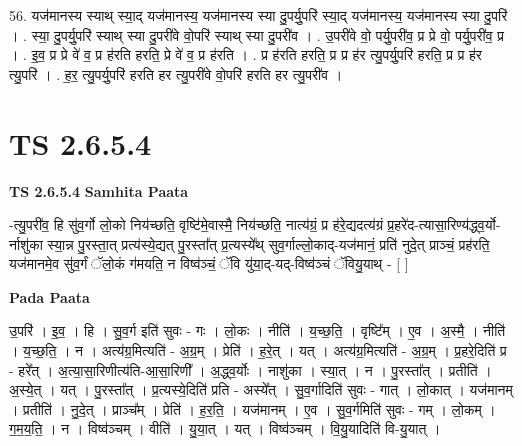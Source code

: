\documentclass[17pt]{extarticle}
\begin{document}
56. यज॑मानस्य स्याथ् स्या॒द् यज॑मानस्य॒ यज॑मानस्य स्या दु॒पर्यु॒परि॑ स्या॒द् यज॑मानस्य॒ यज॑मानस्य स्या दु॒परि॑ । . स्या॒ दु॒पर्यु॒परि॑ स्याथ् स्या दु॒परी॑वे वो॒परि॑ स्याथ् स्या दु॒परी॑व । . उ॒परी॑वे वो॒ पर्यु॒परी॑व॒ प्र प्रे वो॒ पर्यु॒परी॑व॒ प्र । . इ॒व॒ प्र प्रे वे॑ व॒ प्र ह॑रति हरति॒ प्रे वे॑ व॒ प्र ह॑रति । . प्र ह॑रति हरति॒ प्र प्र ह॑र त्यु॒पर्यु॒परि॑ हरति॒ प्र प्र ह॑र त्यु॒परि॑ । . ह॒र॒ त्यु॒पर्यु॒परि॑ हरति हर त्यु॒परी॑वे वो॒परि॑ हरति हर त्यु॒परी॑व । \newline
\pagebreak
{}

\section{ TS 2.6.5.4 }

\textbf{TS 2.6.5.4 } \newline
\textbf{Samhita Paata} \newline

-त्यु॒परी॑व॒ हि सु॑व॒र्गो लो॒को निय॑च्छति॒ वृष्टि॑मे॒वास्मै॒ निय॑च्छति॒ नात्य॑ग्रं॒ प्र ह॑रे॒द्यदत्य॑ग्रं प्र॒हरे॑द-त्यासा॒रिण्य॑द्ध्व॒र्यो-र्नाशु॑का स्या॒न्न पु॒रस्ता॒त् प्रत्य॑स्ये॒द्यत् पु॒रस्ता᳚त् प्र॒त्यस्ये᳚थ् सुव॒र्गाल्लो॒काद्-यज॑मानं॒ प्रति॑ नुदे॒त् प्राञ्चं॒ प्रह॑रति॒ यज॑मानमे॒व सु॑व॒र्गं ॅलो॒कं ग॑मयति॒ न विष्व॑ञ्चं॒ ॅवि यु॑या॒द्-यद्-विष्व॑ञ्चं ॅवियु॒याथ् - [  ] \newline

\textbf{Pada Paata} \newline

उ॒परि॑ । इ॒व॒ । हि । सु॒व॒र्ग इति॑ सुवः - गः । लो॒कः । नीति॑ । य॒च्छ॒ति॒ । वृष्टि᳚म् । ए॒व । अ॒स्मै॒ । नीति॑ । य॒च्छ॒ति॒ । न । अत्य॑ग्र॒मित्यति॑ - अ॒ग्र॒म् । प्रेति॑ । ह॒रे॒त् । यत् । अत्य॑ग्र॒मित्यति॑ - अ॒ग्र॒म् । प्र॒हरे॒दिति॑ प्र - हरे᳚त् । अ॒त्या॒सा॒रिणीत्य॑ति-आ॒सा॒रिणी᳚ । अ॒द्ध्व॒र्योः । नाशु॑का । स्या॒त् । न । पु॒रस्ता᳚त् । प्रतीति॑ । अ॒स्ये॒त् । यत् । पु॒रस्ता᳚त् । प्र॒त्यस्ये॒दिति॑ प्रति - अस्ये᳚त् । सु॒व॒र्गादिति॑ सुवः - गात् । लो॒कात् । यज॑मानम् । प्रतीति॑ । नु॒दे॒त् । प्राञ्च᳚म् । प्रेति॑ । ह॒र॒ति॒ । यज॑मानम् । ए॒व । सु॒व॒र्गमिति॑ सुवः - गम् । लो॒कम् । ग॒म॒य॒ति॒ । न । विष्व॑ञ्चम् । वीति॑ । यु॒या॒त् । यत् । विष्व॑ञ्चम् । वि॒यु॒यादिति॑ वि-यु॒यात् ।  \newline
\end{document}
